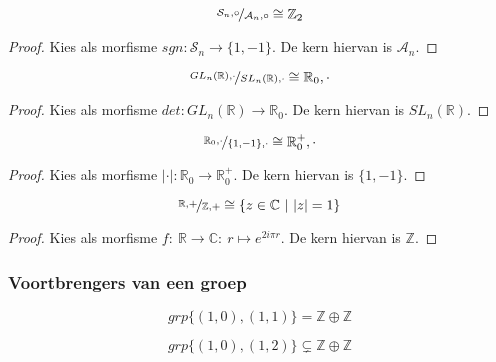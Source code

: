 \documentclass[main.tex]{subfiles}
\begin{document}
\begin{vb}
  \[ \nicefrac{\mathcal{S}_{n},\circ}{\mathcal{A}_{n},\circ} \cong \mathbb{Z}_{2} \]
  
  \begin{proof}
    Kies als morfisme $sgn: \mathcal{S}_{n} \rightarrow \{ 1,-1 \}$.
    De kern hiervan is $\mathcal{A}_{n}$.
  \end{proof}
\end{vb}

\begin{vb}
  \[ \nicefrac{GL_{n}(\mathbb{R}),\cdot}{SL_{n}(\mathbb{R}),\cdot} \cong \mathbb{R}_{0},\cdot \]
  
  \begin{proof}
    Kies als morfisme $det: GL_{n}(\mathbb{R}) \rightarrow
    \mathbb{R}_{0}$.  De kern hiervan is $SL_{n}(\mathbb{R})$.
  \end{proof}
\end{vb}

\begin{vb}
  \[ \nicefrac{\mathbb{R}_{0},\cdot}{\{1,-1\},\cdot} \cong \mathbb{R}_{0}^{+},\cdot \]

  \begin{proof}
    Kies als morfisme $|\cdot|: \mathbb{R}_{0} \rightarrow \mathbb{R}_{0}^{+}$.
    De kern hiervan is $\{1,-1\}$.
  \end{proof}
\end{vb}

\begin{vb}
  \[ \nicefrac{\mathbb{R},+}{\mathbb{Z},+} \cong \{ z \in \mathbb{C} \ |\ |z| = 1 \} \]

  \begin{proof}
    Kies als morfisme $f:\ \mathbb{R} \rightarrow \mathbb{C}:\ r \mapsto e^{2i\pi r}$.
    De kern hiervan is $\mathbb{Z}$.
  \end{proof}
\end{vb}

\subsubsection{Voortbrengers van een groep}

\begin{vb}
  \[ grp\{ (1,0),(1,1) \} = \mathbb{Z}\oplus\mathbb{Z} \]
\end{vb}

\begin{vb}
  \[ grp\{ (1,0),(1,2) \} \subsetneq \mathbb{Z}\oplus\mathbb{Z} \]
\end{vb}
\end{document}
